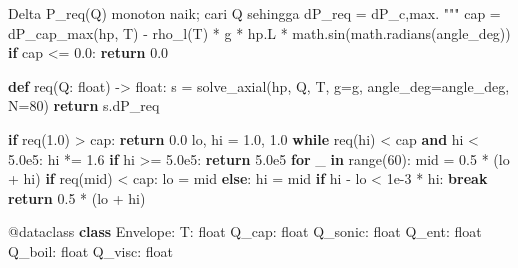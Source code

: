 \documentclass[
  indonesian,
  12pt,
  a4paper,
]{report}
\newenvironment{Shaded}{\begin{snugshade}}{\end{snugshade}}
\newcommand{\AttributeTok}[1]{\textcolor[rgb]{0.40,0.45,0.13}{#1}}
\newcommand{\BuiltInTok}[1]{\textcolor[rgb]{0.00,0.23,0.31}{#1}}
\newcommand{\CommentTok}[1]{\textcolor[rgb]{0.37,0.37,0.37}{#1}}
\newcommand{\ControlFlowTok}[1]{\textcolor[rgb]{0.00,0.23,0.31}{\textbf{#1}}}
\newcommand{\DecValTok}[1]{\textcolor[rgb]{0.68,0.00,0.00}{#1}}
\newcommand{\FloatTok}[1]{\textcolor[rgb]{0.68,0.00,0.00}{#1}}
\newcommand{\KeywordTok}[1]{\textcolor[rgb]{0.00,0.23,0.31}{\textbf{#1}}}
\newcommand{\NormalTok}[1]{\textcolor[rgb]{0.00,0.23,0.31}{#1}}
\newcommand{\OperatorTok}[1]{\textcolor[rgb]{0.37,0.37,0.37}{#1}}
\begin{document}
\begin{Shaded}
\begin{Highlighting}[]
\CommentTok{    Delta P\_req(Q) monoton naik; cari Q sehingga dP\_req = dP\_c,max.}
\CommentTok{    """}
\NormalTok{    cap }\OperatorTok{=}\NormalTok{ dP\_cap\_max(hp, T) }\OperatorTok{{-}}\NormalTok{ rho\_l(T) }\OperatorTok{*}\NormalTok{ g }\OperatorTok{*}\NormalTok{ hp.L }\OperatorTok{*}\NormalTok{ math.sin(math.radians(angle\_deg))}
    \ControlFlowTok{if}\NormalTok{ cap }\OperatorTok{\textless{}=} \FloatTok{0.0}\NormalTok{:}
        \ControlFlowTok{return} \FloatTok{0.0}

    \KeywordTok{def}\NormalTok{ req(Q: }\BuiltInTok{float}\NormalTok{) }\OperatorTok{{-}\textgreater{}} \BuiltInTok{float}\NormalTok{:}
\NormalTok{        s }\OperatorTok{=}\NormalTok{ solve\_axial(hp, Q, T, g}\OperatorTok{=}\NormalTok{g, angle\_deg}\OperatorTok{=}\NormalTok{angle\_deg, N}\OperatorTok{=}\DecValTok{80}\NormalTok{)}
        \ControlFlowTok{return}\NormalTok{ s.dP\_req}

    \ControlFlowTok{if}\NormalTok{ req(}\FloatTok{1.0}\NormalTok{) }\OperatorTok{\textgreater{}}\NormalTok{ cap:}
        \ControlFlowTok{return} \FloatTok{0.0}
\NormalTok{    lo, hi }\OperatorTok{=} \FloatTok{1.0}\NormalTok{, }\FloatTok{1.0}
    \ControlFlowTok{while}\NormalTok{ req(hi) }\OperatorTok{\textless{}}\NormalTok{ cap }\KeywordTok{and}\NormalTok{ hi }\OperatorTok{\textless{}} \FloatTok{5.0e5}\NormalTok{:}
\NormalTok{        hi }\OperatorTok{*=} \FloatTok{1.6}
    \ControlFlowTok{if}\NormalTok{ hi }\OperatorTok{\textgreater{}=} \FloatTok{5.0e5}\NormalTok{:}
        \ControlFlowTok{return} \FloatTok{5.0e5}
    \ControlFlowTok{for}\NormalTok{ \_ }\KeywordTok{in} \BuiltInTok{range}\NormalTok{(}\DecValTok{60}\NormalTok{):}
\NormalTok{        mid }\OperatorTok{=} \FloatTok{0.5} \OperatorTok{*}\NormalTok{ (lo }\OperatorTok{+}\NormalTok{ hi)}
        \ControlFlowTok{if}\NormalTok{ req(mid) }\OperatorTok{\textless{}}\NormalTok{ cap:}
\NormalTok{            lo }\OperatorTok{=}\NormalTok{ mid}
        \ControlFlowTok{else}\NormalTok{:}
\NormalTok{            hi }\OperatorTok{=}\NormalTok{ mid}
        \ControlFlowTok{if}\NormalTok{ hi }\OperatorTok{{-}}\NormalTok{ lo }\OperatorTok{\textless{}} \FloatTok{1e{-}3} \OperatorTok{*}\NormalTok{ hi:}
            \ControlFlowTok{break}
    \ControlFlowTok{return} \FloatTok{0.5} \OperatorTok{*}\NormalTok{ (lo }\OperatorTok{+}\NormalTok{ hi)}


\AttributeTok{@dataclass}
\KeywordTok{class}\NormalTok{ Envelope:}
\NormalTok{    T: }\BuiltInTok{float}
\NormalTok{    Q\_cap: }\BuiltInTok{float}
\NormalTok{    Q\_sonic: }\BuiltInTok{float}
\NormalTok{    Q\_ent: }\BuiltInTok{float}
\NormalTok{    Q\_boil: }\BuiltInTok{float}
\NormalTok{    Q\_visc: }\BuiltInTok{float}


\end{Highlighting}
\end{Shaded}
\end{document}
